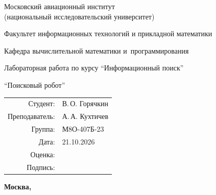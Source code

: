 \begin{titlepage}
\begin{center}
\bfseries

{\Large Московский авиационный институт\\ (национальный исследовательский университет)

}

\vspace{48pt}

{\large Факультет информационных технологий и прикладной математики
}

\vspace{36pt}

{\large Кафедра вычислительной математики и~программирования

}

\vspace{48pt}

Лабораторная работа  по курсу \enquote{Информационный поиск}

\vspace{12pt}

{\large \enquote{Поисковый робот}}

\end{center}

\vspace{72pt}

\begin{flushright}
\begin{tabular}{rl}
Студент: & В.\,О. Горячкин \\
Преподаватель: & А.\,А. Кухтичев \\
Группа: & М8О-407Б-23 \\
Дата: & 21.10.2026 \\
Оценка: & \\
Подпись: & \\
\end{tabular}
\end{flushright}

\vfill

\begin{center}
\bfseries
Москва, \the\year
\end{center}
\end{titlepage}

\pagebreak
